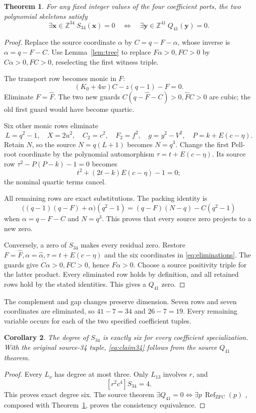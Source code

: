 \documentclass[11pt,a4paper]{article}
\newtheorem{theorem}{Theorem}[section]
\newtheorem{corollary}[theorem]{Corollary}
\theoremstyle{definition}
\newcommand{\Z}{\mathbb Z}
\newcommand{\ZFCRef}{\operatorname{Ref}_{\mathrm{ZFC}}}
\begin{document}
\begin{theorem}
\label{thm:s34}
For any fixed integer values of the four coefficient ports, the two
polynomial skeletons satisfy
\[
 \exists\mathbf x\in\Z^{34}\ S_{34}(\mathbf x)=0
 \quad\Longleftrightarrow\quad
 \exists\mathbf y\in\Z^{41}\ Q_{41}(\mathbf y)=0.
\]
\end{theorem}
\begin{proof}
Replace the source coordinate \(\alpha\) by \(C=q-F-\alpha\),
whose inverse is \(\alpha=q-F-C\). Use Lemma~\ref{lem:tree}
to replace \(F\alpha>0,FC>0\) by \(C\alpha>0,FC>0\),
reselecting the first witness triple.

The transport row becomes monic in \(F\):
\[
 (K_0+4w)C-z(q-1)-F=0.
\]
Eliminate \(F=\widehat F\). The two new guards
\(C(q-\widehat F-C)>0,\widehat FC>0\) are cubic; the old
first guard would have become quartic.

Six other monic rows eliminate
\[
 L=q^2-1,\quad X=2u^2,\quad C_2=c^2,\quad F_2=f^2,\quad
 g=y^2-V^2,\quad P=k+E(c-\eta).                 \label{eq:eliminations}
\]
Retain \(N\), so the source \(N=q(L+1)\) becomes \(N=q^3\).
Change the first Pell-root coordinate by the polynomial
automorphism \(\tau=t+E(c-\eta)\). Its source row
\(\tau^2-P(P-k)-1=0\) becomes
\[
 t^2+(2t-k)E(c-\eta)-1=0;
\]
the nominal quartic terms cancel.

All remaining rows are exact substitutions. The packing identity is
\[
 \bigl((q-1)(q-F)+\alpha\bigr)(q^2-1)
   =(q-F)(N-q)-C(q^2-1)
\]
when \(\alpha=q-F-C\) and \(N=q^3\).
This proves that every source zero projects to a new zero.

Conversely, a zero of \(S_{34}\) makes every residual zero.
Restore \(F=\widehat F,\alpha=\widehat\alpha,\tau=t+E(c-\eta)\)
and the six coordinates in \eqref{eq:eliminations}.
The guards give \(C\alpha>0,FC>0\), hence \(F\alpha>0\).
Choose a source positivity triple for the latter product.
Every eliminated row holds by definition, and all retained rows
hold by the stated identities. This gives a \(Q_{41}\) zero.
\end{proof}

The complement and gap changes preserve dimension. Seven rows
and seven coordinates are eliminated, so \(41-7=34\) and
\(26-7=19\). Every remaining variable occurs for each of the two
specified coefficient tuples.

\begin{corollary}
The degree of \(S_{34}\) is exactly six for every coefficient
specialization. With the original source-34 tuple,
\eqref{eq:claim34} follows from the source \(Q_{41}\) theorem.
\end{corollary}
\begin{proof}
Every \(L_\nu\) has degree at most three. Only \(L_{13}\)
involves \(r\), and
\[
 [r^2c^4]S_{34}=4.
\]
This proves exact degree six. The source theorem
\(\exists Q_{41}=0\iff\exists p\,\ZFCRef(p)\)
\cite{q41,q44}, composed with Theorem~\ref{thm:s34}, proves
the consistency equivalence.
\end{proof}
\end{document}
